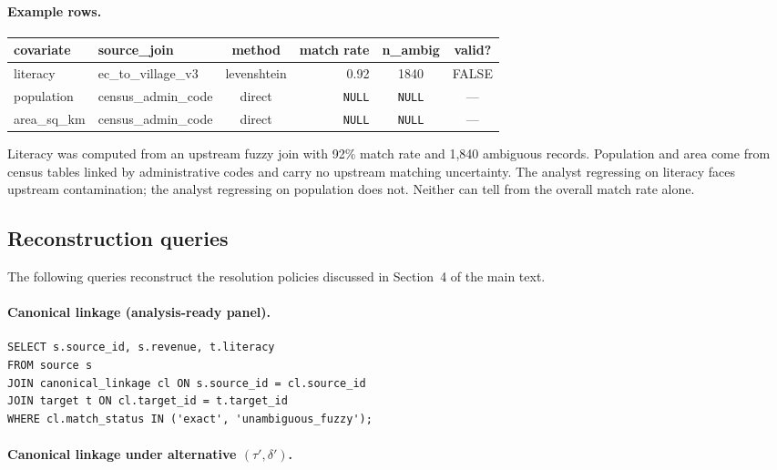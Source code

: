 \paragraph{Example rows.}

\begin{center}
\small
\begin{tabular}{llcrcc}
\toprule
covariate & source\_join & method & match rate & n\_ambig & valid? \\
\midrule
literacy & ec\_to\_village\_v3 & levenshtein & 0.92 & 1840 & FALSE \\
population & census\_admin\_code & direct & \texttt{NULL} & \texttt{NULL} & --- \\
area\_sq\_km & census\_admin\_code & direct & \texttt{NULL} & \texttt{NULL} & --- \\
\bottomrule
\end{tabular}
\end{center}

Literacy was computed from an upstream fuzzy join with 92\% match rate and 1,840 ambiguous records. Population and area come from census tables linked by administrative codes and carry no upstream matching uncertainty. The analyst regressing on literacy faces upstream contamination; the analyst regressing on population does not. Neither can tell from the overall match rate alone.

\subsection{Reconstruction queries}

The following queries reconstruct the resolution policies discussed in Section~4 of the main text.

\paragraph{Canonical linkage (analysis-ready panel).}

\begin{lstlisting}[style=sql]
SELECT s.source_id, s.revenue, t.literacy
FROM source s
JOIN canonical_linkage cl ON s.source_id = cl.source_id
JOIN target t ON cl.target_id = t.target_id
WHERE cl.match_status IN ('exact', 'unambiguous_fuzzy');
\end{lstlisting}

\paragraph{Canonical linkage under alternative $(\tau', \delta')$.}

